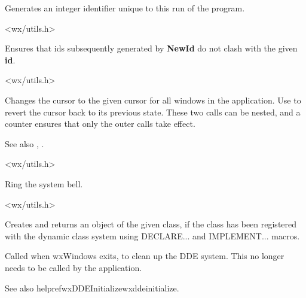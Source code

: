 
Generates an integer identifier unique to this run of the program.


<wx/utils.h>



Ensures that ids subsequently generated by {\bf NewId} do not clash with
the given {\bf id}.


<wx/utils.h>

\label{wxbeginbusycursor}


Changes the cursor to the given cursor for all windows in the application.
Use  to revert the cursor back
to its previous state. These two calls can be nested, and a counter
ensures that only the outer calls take effect.

See also , .


<wx/utils.h>



Ring the system bell.


<wx/utils.h>

\label{wxcreatedynamicobject}


Creates and returns an object of the given class, if the class has been
registered with the dynamic class system using DECLARE... and IMPLEMENT... macros.

\label{wxddecleanup}


Called when wxWindows exits, to clean up the DDE system. This no longer needs to be
called by the application.

See also helpref{wxDDEInitialize}{wxddeinitialize}.

